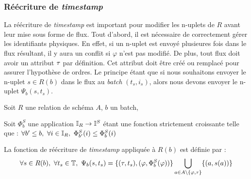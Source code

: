 \subsubsection{Réécriture de \textit{timestamp}}
La réécriture de \textit{timestamp} est important pour modifier les n-uplets de $R$ avant leur mise sous forme de flux. Tout d'abord, il est nécessaire de correctement gérer les identifiants physiques. En effet, si un n-uplet est envoyé plusieures fois dans le flux résultant, il y aura un conflit si $\varphi$ n'est pas modifié. De plus, tout flux doit avoir un attribut $\tau$ par définition. Cet attribut doit être créé ou remplacé pour assurer l'hypothèse de ordres. Le principe étant que si nous souhaitons envoyer le n-uplet $s\in R(b)$ dans le flux au \textit{batch} $(t_s,i_s)$, alors nous devons envoyer le n-uplet $\Psi_b(s,t_s)$.
\begin{defi}
    Soit $R$ une relation de schéma $A$, $b$ un batch,

    Soit $\Phi_b^S$ une application $\mathbb{I}_{R} \to \mathbb{I}^S$ étant une fonction strictement croissante telle que : 
        $\forall b'\leq b, \ \forall i\in \I_R, \ \Phi_{b'}^S(i) \leq \Phi_b^S(i)$

    La fonction de réécriture de \textit{timestamp} appliquée à $R(b)$ est définie par : 
$$\forall s\in R(b), \ \forall t_s\in\T, \ \Psi_b(s,t_s) = \{(\t,t_s), (\varphi, \Phi_b^S(\varphi))\}\bigcup_{a\in A\backslash\{\varphi,\t\}}\{(a,s(a))\}$$
\end{defi}

